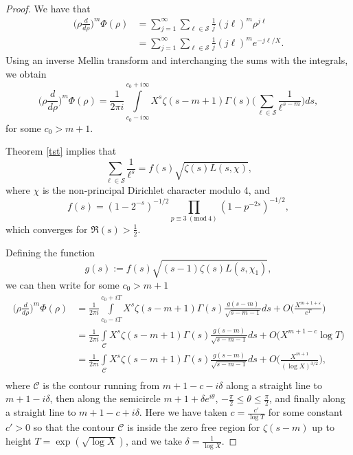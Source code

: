 \documentclass[10pt,a4paper]{amsart}
\newcommand{\Mod}[1]{\ (\mathrm{mod}\ #1)}
\begin{document}
\begin{proof}
We have that
\begin{align*}
    \Big(\rho \frac{d}{d\rho}\Big)^m\Phi(\rho)&=\sum_{j=1}^\infty \sum_{\ell\in \mathcal{S}} \frac{1}{j} (j\ell)^m \rho^{j\ell}\\
    & =\sum_{j=1}^\infty \sum_{\ell\in \mathcal{S}} \frac{1}{j} (j\ell)^m e^{-j\ell/X}.
\end{align*}
   Using an inverse Mellin transform and interchanging the sums with the integrals, we obtain
\begin{equation*}
     \Big(\rho \frac{d}{d\rho}\Big)^m\Phi(\rho) = \frac{1}{2\pi i} \int\limits_{c_0-i\infty}^{c_0+i\infty} X^s\zeta(s-m+1)\Gamma(s)\Bigg(\sum_{\ell \in \mathcal{S}} \frac{1}{\ell^{s-m}}\Bigg) ds,
\end{equation*}
for some $c_0>m+1$.

      Theorem \ref{tst} implies that 
    \begin{equation*}
        \sum_{\ell\in \mathcal{S}} \frac{1}{\ell^s}= f(s)\sqrt{\zeta(s)L(s,\chi)},
    \end{equation*}
    where $\chi$ is the non-principal Dirichlet character modulo 4, and 
    \begin{equation*}
        f(s)=(1-2^{-s})^{-1/2}\prod_{p \equiv 3 \Mod 4} (1-p^{-2s})^{-1/2},
    \end{equation*}
which converges for $\Re( s)>\frac{1}{2}$.

Defining the  function $$g(s):=f(s)\sqrt{(s-1)\zeta(s)L(s,\chi_1)},$$  we can then write for some $c_0>m+1$ 
\begin{align*}
    \Big(\rho \frac{d}{d\rho}\Big)^m\Phi(\rho) & =  \frac{1}{2\pi i} \int\limits_{c_0-iT}^{c_0+iT} X^s\zeta(s-m+1)\Gamma(s) \frac{g(s-m)}{\sqrt{s-m-1}} ds+O\Big(\frac{X^{m+1+\varepsilon}}{e^T}\Big)  \quad  \\ %
    & =  \frac{1}{2\pi i} \int\limits_{\mathcal{C}} X^s\zeta(s-m+1)\Gamma(s) \frac{g(s-m)}{\sqrt{s-m-1}} ds+O\Big(X^{m+1-c}\log T\Big)  \\
    & =  \frac{1}{2\pi i} \int\limits_{\mathcal{C}} X^s\zeta(s-m+1)\Gamma(s) \frac{g(s-m)}{\sqrt{s-m-1}} ds+O\Bigg(\frac{X^{m+1}}{(\log X)^{3/2}}\Bigg), \\
\end{align*}
where $\mathcal{C}$ is the contour running from $m+1-c-i\delta$ along a straight line to $m+1-i\delta$, then along the semicircle $m+1+\delta e^{i\theta}$, $-\frac{\pi}{2}\leq \theta \leq \frac{\pi}{2}$, and finally along a straight line to $m+1-c+i\delta$. Here we have taken  $c= \frac{c'}{\log T}$ for some constant $c'>0$ so that the contour $\mathcal{C}$ is inside the zero free region for $\zeta(s-m)$ up to height $T=\exp(\sqrt{\log X})$, and we take $\delta= \frac{1}{\log X}$. 


\end{proof}
\end{document}
